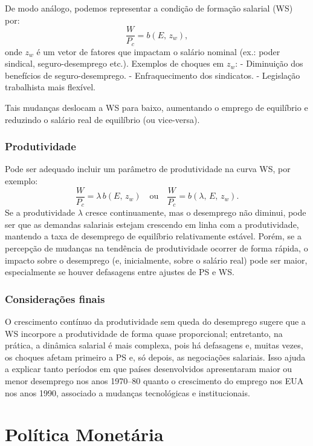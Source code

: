 \documentclass[a4paper,12pt]{article}[abntex2]
\begin{document}
De modo análogo, podemos representar a condição de formação salarial (WS) por:
\[
\frac{W}{P_c} = b(E,\,z_w),
\]
onde \(z_w\) é um vetor de fatores que impactam o salário nominal (ex.: poder sindical, seguro-desemprego etc.). Exemplos de choques em \(z_w\):
- Diminuição dos benefícios de seguro-desemprego.  
- Enfraquecimento dos sindicatos.  
- Legislação trabalhista mais flexível.  

Tais mudanças deslocam a WS para baixo, aumentando o emprego de equilíbrio e reduzindo o salário real de equilíbrio (ou vice-versa).

\subsubsection{\textbf{Produtividade}}

Pode ser adequado incluir um parâmetro de produtividade na curva WS, por exemplo:
\[
\frac{W}{P_c} = \lambda \, b(E,\,z_w)
\quad \text{ou} \quad
\frac{W}{P_c} = b(\lambda,\,E,\,z_w).
\]
Se a produtividade \(\lambda\) cresce continuamente, mas o desemprego não diminui, pode ser que as demandas salariais estejam crescendo em linha com a produtividade, mantendo a taxa de desemprego de equilíbrio relativamente estável. Porém, se a percepção de mudanças na tendência de produtividade ocorrer de forma rápida, o impacto sobre o desemprego (e, inicialmente, sobre o salário real) pode ser maior, especialmente se houver defasagens entre ajustes de PS e WS.

\subsubsection{\textbf{Considerações finais}}

O crescimento contínuo da produtividade sem queda do desemprego sugere que a WS incorpore a produtividade de forma quase proporcional; entretanto, na prática, a dinâmica salarial é mais complexa, pois há defasagens e, muitas vezes, os choques afetam primeiro a PS e, só depois, as negociações salariais. Isso ajuda a explicar tanto períodos em que países desenvolvidos apresentaram maior ou menor desemprego nos anos 1970--80 quanto o crescimento do emprego nos EUA nos anos 1990, associado a mudanças tecnológicas e institucionais.

\newpage
\section{\textbf{Política Monetária}}
\end{document}
